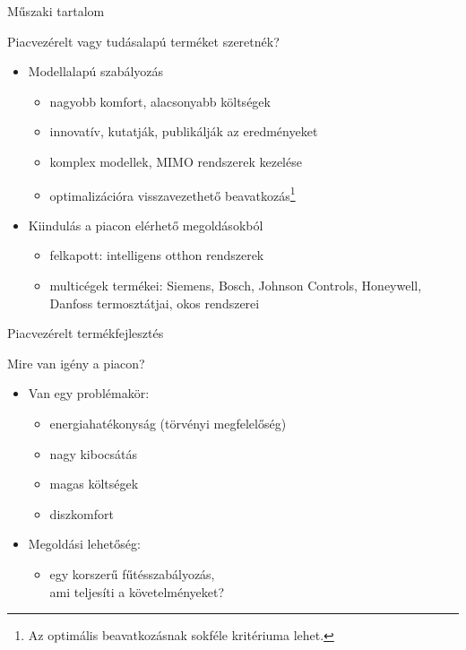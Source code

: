 \documentclass[14pt,handout]{beamer}
\begin{document}
\begin{frame}{Műszaki tartalom}

Piacvezérelt vagy tudásalapú terméket szeretnék?

\begin{itemize}
	\setlength{\itemsep}{7pt}
	\item Modellalapú szabályozás
	\begin{itemize}
		\item nagyobb komfort, alacsonyabb költségek
		\item innovatív, kutatják, publikálják az eredményeket
		\item komplex modellek, MIMO rendszerek kezelése
		\item optimalizációra visszavezethető beavatkozás\footnote{Az optimális beavatkozásnak sokféle kritériuma lehet.}
	\end{itemize}
	\item Kiindulás a piacon elérhető megoldásokból
	\begin{itemize}
		\item felkapott: intelligens otthon rendszerek
		\item multicégek termékei: Siemens, Bosch, Johnson Controls, Honeywell, Danfoss termosztátjai, okos rendszerei
	\end{itemize}
\end{itemize}
\end{frame}

\begin{frame}{Piacvezérelt termékfejlesztés}

Mire van igény a piacon?

\begin{itemize}
	\setlength{\itemsep}{7pt}
	\item Van egy problémakör:
	\begin{itemize}
		\item energiahatékonyság (törvényi megfelelőség)
		\item nagy kibocsátás
		\item magas költségek
		\item diszkomfort
	\end{itemize}
	\pause
	
	\item Megoldási lehetőség:
	\begin{itemize}
		\item egy korszerű fűtésszabályozás,\\
		ami teljesíti a követelményeket?
	\end{itemize}
\end{itemize}
\end{frame}
\end{document}
